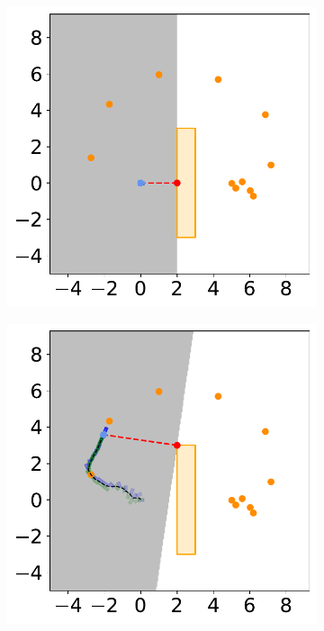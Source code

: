\newpage
\begin{figure}[H]
    \centering
    \begin{subfigure}{0.35\textwidth}
        \centering
        \includegraphics[width=\textwidth]{figures/Simulations/sim_rrt/frame_0.pdf}
    \end{subfigure}%
    \hspace{1em}
    \begin{subfigure}{0.35\textwidth}
        \centering
        \includegraphics[width=\textwidth]{figures/Simulations/sim_rrt/frame_2.pdf}
    \end{subfigure}%
   

\end{figure}
